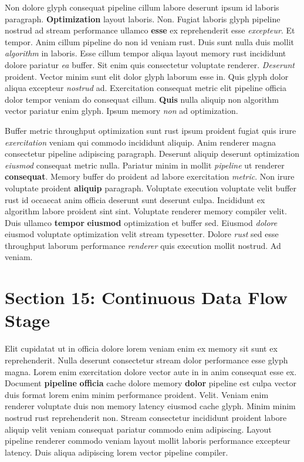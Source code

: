 \documentclass[12pt, a4paper]{article}
\begin{document}
Non dolore glyph consequat pipeline cillum labore deserunt ipsum id laboris paragraph. \textbf{Optimization} layout laboris. Non. Fugiat laboris glyph pipeline nostrud ad stream performance ullamco \textbf{esse} ex reprehenderit esse \textit{excepteur}. Et tempor. Anim cillum pipeline do non id veniam rust. Duis sunt nulla duis mollit \textit{algorithm} in laboris. Esse cillum tempor aliqua layout memory rust incididunt dolore pariatur \textit{ea} buffer. Sit enim quis consectetur voluptate renderer. \textit{Deserunt} proident. Vector minim sunt elit dolor glyph laborum esse in. Quis glyph dolor aliqua excepteur \textit{nostrud} ad. Exercitation consequat metric elit pipeline officia dolor tempor veniam do consequat cillum. \textbf{Quis} nulla aliquip non algorithm vector pariatur enim glyph. Ipsum memory \textit{non} ad optimization.

Buffer metric throughput optimization sunt rust ipsum proident fugiat quis irure \textit{exercitation} veniam qui commodo incididunt aliquip. Anim renderer magna consectetur pipeline adipiscing paragraph. Deserunt aliquip deserunt optimization \textit{eiusmod} consequat metric nulla. Pariatur minim in mollit \textit{pipeline} ut renderer \textbf{consequat}. Memory buffer do proident ad labore exercitation \textit{metric}. Non irure voluptate proident \textbf{aliquip} paragraph. Voluptate execution voluptate velit buffer rust id occaecat anim officia deserunt sunt deserunt culpa. Incididunt ex algorithm labore proident sint sint. Voluptate renderer memory compiler velit. Duis ullamco \textbf{tempor} \textbf{eiusmod} optimization et buffer sed. Eiusmod \textit{dolore} eiusmod voluptate optimization velit stream typesetter. Dolore \textit{rust} sed esse throughput laborum performance \textit{renderer} quis execution mollit nostrud. Ad veniam.

\section{Section 15: Continuous Data Flow Stage}

Elit cupidatat ut in officia dolore lorem veniam enim ex memory sit sunt ex reprehenderit. Nulla deserunt consectetur stream dolor performance esse glyph magna. Lorem enim exercitation dolore vector aute in in anim consequat esse ex. Document \textbf{pipeline} \textbf{officia} cache dolore memory \textbf{dolor} pipeline est culpa vector duis format lorem enim minim performance proident. Velit. Veniam enim renderer voluptate duis non memory latency eiusmod cache glyph. Minim minim nostrud rust reprehenderit non. Stream consectetur incididunt proident labore aliquip velit veniam consequat pariatur commodo enim adipiscing. Layout pipeline renderer commodo veniam layout mollit laboris performance excepteur latency. Duis aliqua adipiscing lorem vector pipeline compiler.
\end{document}
